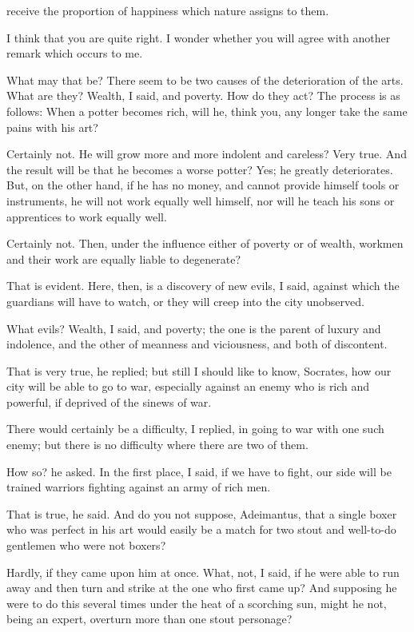 receive the proportion of happiness which nature assigns to them.

I think that you are quite right.
I wonder whether you will agree with another remark which occurs to me.

What may that be?
There seem to be two causes of the deterioration of the arts.
What are they?
Wealth, I said, and poverty.
How do they act?
The process is as follows: When a potter becomes rich, will he, think you, any longer take the same pains with his art?

Certainly not.
He will grow more and more indolent and careless?
Very true.
And the result will be that he becomes a worse potter?
Yes; he greatly deteriorates.
But, on the other hand, if he has no money, and cannot provide himself tools or instruments, he will not work equally well himself, nor will he teach his sons or apprentices to work equally well.

Certainly not.
Then, under the influence either of poverty or of wealth, workmen and their work are equally liable to degenerate?

That is evident.
Here, then, is a discovery of new evils, I said, against which the guardians will have to watch, or they will creep into the city unobserved.

What evils?
Wealth, I said, and poverty; the one is the parent of luxury and indolence, and the other of meanness and viciousness, and both of discontent.

That is very true, he replied; but still I should like to know, Socrates, how our city will be able to go to war, especially against an enemy who is rich and powerful, if deprived of the sinews of war.

There would certainly be a difficulty, I replied, in going to war with one such enemy; but there is no difficulty where there are two of them.

How so? he asked.
In the first place, I said, if we have to fight, our side will be trained warriors fighting against an army of rich men.

That is true, he said.
And do you not suppose, Adeimantus, that a single boxer who was perfect in his art would easily be a match for two stout and well-to-do gentlemen who were not boxers?

Hardly, if they came upon him at once.
What, not, I said, if he were able to run away and then turn and strike at the one who first came up? And supposing he were to do this several times under the heat of a scorching sun, might he not, being an expert, overturn more than one stout personage?

